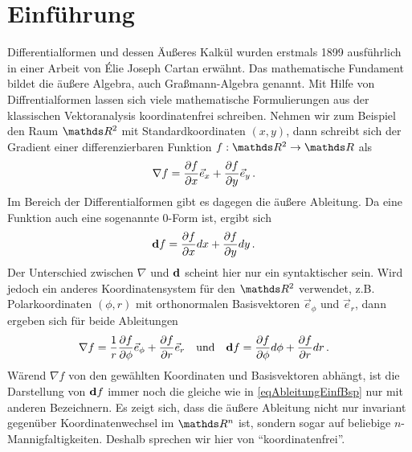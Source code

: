 \setcounter{page}{1} 
\setcounter{chapter}{-1}
\chapter{Einführung}

Differentialformen und dessen Äußeres Kalkül wurden erstmals 1899 ausführlich in einer Arbeit von \'{E}lie Joseph Cartan \cite{cartan} erwähnt.
Das mathematische Fundament bildet die äußere Algebra, auch Graßmann-Algebra genannt.
Mit Hilfe von Diffrentialformen lassen sich viele mathematische Formulierungen aus der klassischen Vektoranalysis koordinatenfrei schreiben.
Nehmen wir zum Beispiel den Raum \( \R^{2} \) mit Standardkoordinaten \( (x,y) \), dann schreibt sich der Gradient einer differenzierbaren Funktion 
\( f:\R^{2}\rightarrow \R \) als
\begin{align}
  \nabla f &= \frac{\partial f}{\partial x} \vec{e}_{x} + \frac{\partial f}{\partial y} \vec{e}_{y} \,\text{.}
\end{align}
Im Bereich der Differentialformen gibt es dagegen die äußere Ableitung.
Da eine Funktion auch eine sogenannte 0-Form ist, ergibt sich
\begin{align}
  \label{eqAbleitungEinfBsp}
  \mathbf{d} f &= \frac{\partial f}{\partial x} dx + \frac{\partial f}{\partial y} dy \,\text{.}
\end{align}
Der Unterschied zwischen \( \nabla \) und \( \mathbf{d} \) scheint hier nur ein syntaktischer sein.
Wird jedoch ein anderes Koordinatensystem für den \( \R^{2} \) verwendet, z.B. Polarkoordinaten \((\phi , r)\) mit orthonormalen Basisvektoren 
\(  \vec{e}_{\phi} \) und \( \vec{e}_{r} \),
dann ergeben sich für beide Ableitungen
\begin{align}
  \nabla f &= \frac{1}{r}\frac{\partial f}{\partial \phi} \vec{e}_{\phi} + \frac{\partial f}{\partial r} \vec{e}_{r} \quad\text{und}\quad 
  \mathbf{d} f = \frac{\partial f}{\partial \phi} d\phi + \frac{\partial f}{\partial r} dr \,\text{.}
\end{align}
Wärend \( \nabla f \) von den gewählten Koordinaten und Basisvektoren abhängt, ist die Darstellung von \( \mathbf{d} f \) immer noch die gleiche wie in 
\eqref{eqAbleitungEinfBsp} nur mit anderen Bezeichnern.
Es zeigt sich, dass die äußere Ableitung nicht nur invariant gegenüber Koordinatenwechsel im \( \R^{n} \) ist, sondern sogar auf beliebige \( n \)-Mannigfaltigkeiten.
Deshalb sprechen wir hier von "`koordinatenfrei"'.

